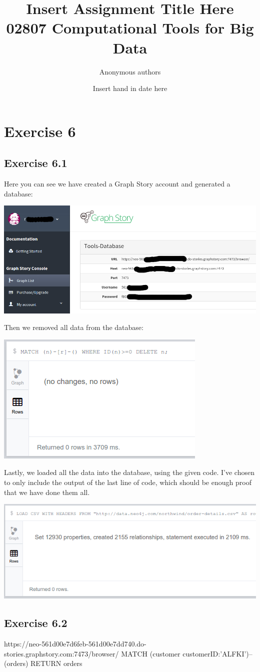 \documentclass{article}
\title{Insert Assignment Title Here\\02807 Computational Tools for Big Data}
\author{Anonymous authors}
\date{Insert hand in date here}
\begin{document}
\maketitle

\section{Exercise 6}
\label{sec:Exercise 6}
\subsection{Exercise 6.1}
\label{sub:Exercise 6.1}

Here you can see we have created a Graph Story account and generated a database:

\includegraphics[scale=0.45]{graph_story.png}

Then we removed all data from the database:

\includegraphics[scale=0.5]{delete_all.png}

Lastly, we loaded all the data into the database, using the given code.
I've chosen to only include the output of the last line of code, which should be
enough proof that we have done them all.

\includegraphics[scale=0.5]{insert_data.png}

\subsection{Exercise 6.2}
\label{sub:Exercise 6.2}

https://neo-561d00e7d6feb-561d00e7dd740.do-stories.graphstory.com:7473/browser/
MATCH (customer {customerID:'ALFKI'})--(orders) RETURN orders
\end{document}
